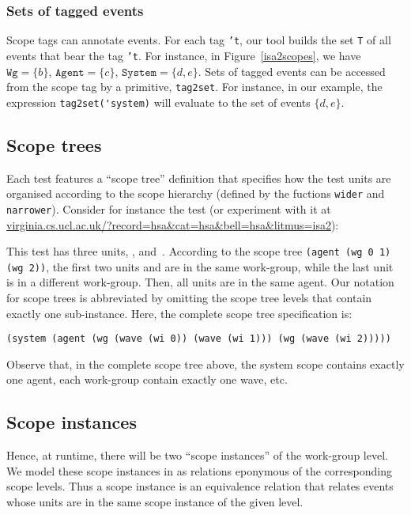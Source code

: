 \subsubsection{Sets of tagged events}

Scope tags can annotate events. For each tag {\tt 't}, our  tool
builds the set {\tt T} of all events that bear the tag {\tt 't}. For instance,
in Figure~\ref{isa2scopes}, we have
$\texttt{Wg} = \{ b \}$,
$\texttt{Agent} = \{ c \}$,
$\texttt{System} = \{ d,e \}$.
Sets of tagged events can be accessed from the scope tag
by a primitive, \verb+tag2set+.  For instance, in our  example, the
expression \verb+tag2set('system)+ will evaluate to the set of events
$\{d,e\}$.

\subsection{Scope trees}

Each test features a ``scope tree'' definition that specifies how the test
units are organised according to the scope hierarchy (defined by the fuctions
{\tt wider} and {\tt narrower}). Consider for instance the test  (or experiment with it at \url{virginia.cs.ucl.ac.uk/?record=hsa&cat=hsa&bell=hsa&litmus=isa2}):

\pagebreak

{\footnotesize

}
This test has three units, ,  and~.
According to the scope tree \verb+(agent (wg 0 1) (wg 2))+,
the first two units  and  are in the same work-group,
while the last unit~ is in a different work-group.
Then, all units are in the same agent.
Our notation for scope trees is abbreviated by omitting
the scope tree levels that contain exactly one sub-instance.
Here, the complete scope tree specification is:
\begin{verbatim}
(system (agent (wg (wave (wi 0)) (wave (wi 1))) (wg (wave (wi 2)))))
\end{verbatim}
Observe that, in the complete scope tree above,
the system scope contains exactly one agent, each work-group contain
exactly one wave, etc.

\subsection{Scope instances}
Hence, at runtime, there will be two ``scope instances'' of the work-group
level. We model these scope instances in \cat{} as relations eponymous of the
corresponding scope levels. Thus a scope instance is an equivalence relation
that relates events whose units are in the same scope instance of the given
level.

